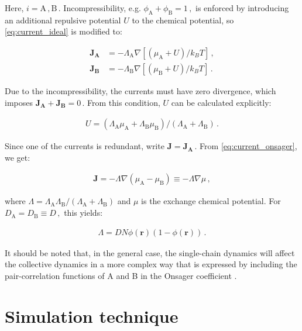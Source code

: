 \documentclass[bachelor,       %
               twoside,        %
               BCOR10mm,       %
                ngerman,english  %
               ]{GAUBM}
\begin{document}
Here, $i=\mathrm A\,,\mathrm B\,.$ Incompressibility, e.g. $\phi_\mathrm A+\phi_\mathrm B=1\,,$ is enforced by introducing an additional repulsive potential $U$ to the chemical potential, so \eqref{eq:current_ideal} is modified to:

\begin{subequations}
  \begin{align}
    \mathbf{J_A}&=-\Lambda_\mathrm A\nabla [(\mu_\mathrm A + U)/k_BT]\,,\\
    \mathbf{J_B}&=-\Lambda_\mathrm B\nabla [(\mu_\mathrm B + U)/k_BT]\,.
  \end{align}
  \label{eq:current_onsager}
\end{subequations}

Due to the incompressibility, the currents must have zero divergence, which imposes $\mathbf{J_A}+\mathbf{J_B}=0\,.$ From this condition, $U$ can be calculated explicitly:

\begin{align}
  U=(\Lambda_\mathrm A\mu_\mathrm A+\Lambda_\mathrm B\mu_\mathrm B)/(\Lambda_\mathrm A+\Lambda_\mathrm B)\,.
\end{align}

Since one of the currents is redundant, write $\mathbf{J}=\mathbf{J_A}\,.$ From \eqref{eq:current_onsager}, we get:

\begin{align}
  \mathbf J=-\Lambda\nabla(\mu_\mathrm A - \mu_\mathrm B)\equiv -\Lambda\nabla\mu\,,
\end{align}

where $\Lambda=\Lambda_\mathrm A\Lambda_\mathrm B/(\Lambda_\mathrm A+\Lambda_\mathrm B)$ and $\mu$ is the exchange chemical potential. For $D_\mathrm A=D_\mathrm B\equiv D\,,$ this yields:

\begin{align}
  \Lambda=DN\phi(\mathbf{r})(1-\phi(\mathbf{r}))\,.
  \label{eq:onsager}
\end{align}


It should be noted that, in the general case, the single-chain dynamics will affect the collective dynamics in a more complex way that is expressed by including the pair-correlation functions of A and B in the Onsager coefficient \cite{Reister02}. 

\chapter{Simulation technique}
\end{document}
